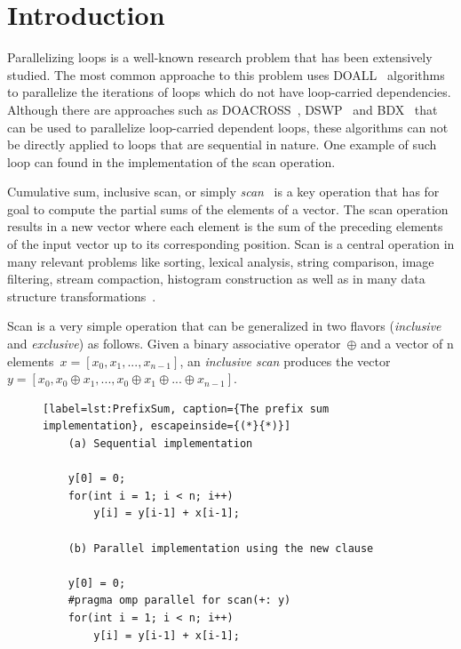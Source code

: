 \documentclass[Ingles]{ic-tese-v1}
\begin{document}
\fimdaspaginasiniciais


\chapter{Introduction}
\label{cap:Introduction}

Parallelizing loops  is a  well-known research  problem that  has been
extensively  studied. The  most common  approache to  this problem  uses
DOALL~\cite{Lamport:1974} algorithms  to parallelize
the iterations of  loops which do not  have loop-carried dependencies.
Although  there  are   approaches  such  as  DOACROSS~\cite{doacross},
DSWP~\cite{Rangan:2004} and  BDX~\cite{Cesar:2015} that
can be  used to parallelize loop-carried dependent  loops, these algorithms
can  not  be  directly  applied   to  loops  that  are  sequential  in
nature. One  example of such loop  can found in the  implementation of
the scan operation.

Cumulative     sum,     inclusive     scan,     or     simply     {\it
scan}~\cite{ScanAsPrimitive} is  a key operation that  has for goal
to compute  the partial  sums of  the elements of  a vector.  The scan
operation results in a new vector where each element is the sum of the
preceding  elements  of  the  input vector  up  to  its  corresponding
position. Scan is a central operation in many  relevant  problems  like  sorting,
lexical  analysis,  string comparison,  image  filtering, stream compaction,
histogram construction as well as  in many data
structure transformations~\cite{BlellochTR90}.

Scan  is a very simple  operation  that can  be generalized
in two flavors (\textit{inclusive} and \textit{exclusive}) as follows.
Given  a binary  associative  operator\  $\oplus$ and  a
vector of  n elements\ $x = [x_{0},  x_{1}, ...  ,x_{n-1}]$,
an   {\em    inclusive   scan}    produces   the    vector
$y =  [ x_{0}, x_{0}  \oplus x_{1},  ... ,x_{0} \oplus  x_{1} \oplus
... \oplus x_{n-1}]$.

\begin{figure}[t]
	\lstset{basicstyle=\scriptsize}
	\begin{lstlisting}[label=lst:PrefixSum, caption={The prefix sum implementation}, escapeinside={(*}{*)}]
	(a) Sequential implementation

	y[0] = 0;
	for(int i = 1; i < n; i++)
		y[i] = y[i-1] + x[i-1];

	(b) Parallel implementation using the new clause

	y[0] = 0;
	#pragma omp parallel for scan(+: y)
	for(int i = 1; i < n; i++)
		y[i] = y[i-1] + x[i-1];
	\end{lstlisting}
	\vspace{-0.7cm}
\end{figure}
\end{document}
